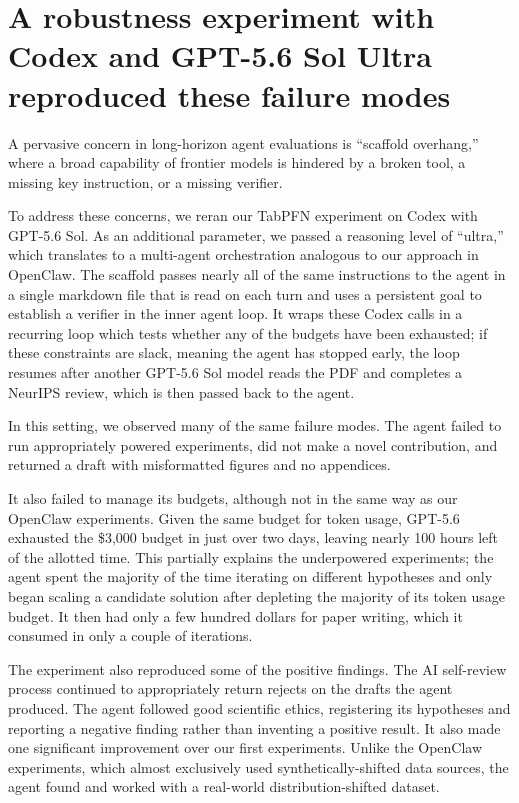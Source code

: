 \section{A robustness experiment with Codex and GPT-5.6 Sol Ultra reproduced
these failure modes}
\label{sec:robustness}

A pervasive concern in long-horizon agent evaluations is ``scaffold
overhang,'' where a broad capability of frontier models is hindered by a
broken tool, a missing key instruction, or a missing verifier.

To address these concerns, we reran our TabPFN experiment on Codex with
GPT-5.6 Sol. As an additional parameter, we passed a reasoning level of
``ultra,'' which translates to a multi-agent orchestration analogous to our
approach in OpenClaw. The scaffold passes nearly all of the same instructions
to the agent in a single markdown file that is read on each turn and uses a
persistent goal to establish a verifier in the inner agent loop. It wraps
these Codex calls in a recurring loop which tests whether any of the budgets
have been exhausted; if these constraints are slack, meaning the agent has
stopped early, the loop resumes after another GPT-5.6 Sol model reads the PDF
and completes a NeurIPS review, which is then passed back to the agent.

In this setting, we observed many of the same failure modes. The agent failed
to run appropriately powered experiments, did not make a novel contribution,
and returned a draft with misformatted figures and no appendices.

It also failed to manage its budgets, although not in the same way as our
OpenClaw experiments. Given the same budget for token usage, GPT-5.6 exhausted the
\$3,000 budget in just over two days, leaving nearly 100 hours left of the
allotted time. This partially explains the underpowered experiments; the agent
spent the majority of the time iterating on different hypotheses and only
began scaling a candidate solution after depleting the majority of its token
usage budget. It then had only a few hundred dollars for paper writing, which
it consumed in only a couple of iterations.

The experiment also reproduced some of the positive findings. The AI
self-review process continued to appropriately return rejects on the drafts
the agent produced. The agent followed good scientific ethics, registering its
hypotheses and reporting a negative finding rather than inventing a positive
result. It also made one significant improvement over our first experiments.
Unlike the OpenClaw experiments, which almost exclusively used synthetically-shifted data sources, the
agent found and worked with a real-world distribution-shifted dataset.

